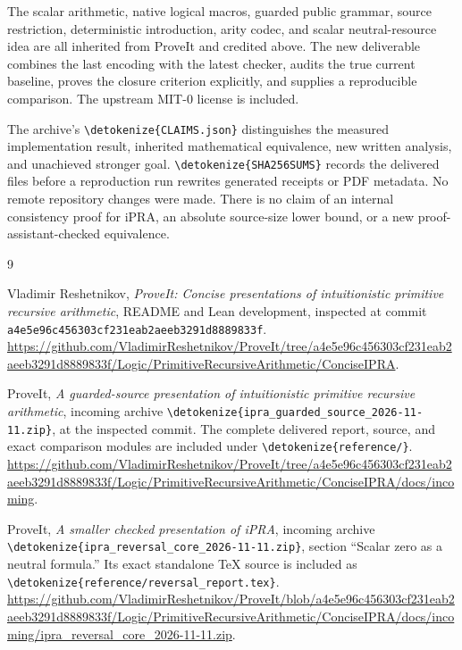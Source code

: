\documentclass[11pt,letterpaper]{article}
\theoremstyle{definition}
\theoremstyle{remark}
\newcommand{\file}[1]{\expandafter\nolinkurl\expandafter{\detokenize{#1}}}
\begin{document}
The scalar arithmetic, native logical macros, guarded public grammar,
source restriction, deterministic introduction, arity codec, and scalar
neutral-resource idea are all inherited from ProveIt and credited above.
The new deliverable combines the last encoding with the latest checker,
audits the true current baseline, proves the closure criterion explicitly,
and supplies a reproducible comparison. The upstream MIT-0 license is
included.

The archive's \file{CLAIMS.json} distinguishes the measured implementation
result, inherited mathematical equivalence, new written analysis, and
unachieved stronger goal. \file{SHA256SUMS} records the delivered files
before a reproduction run rewrites generated receipts or PDF metadata.
No remote repository changes were made. There is no claim of an internal
consistency proof for iPRA, an absolute source-size lower bound, or a new
proof-assistant-checked equivalence.

\begin{thebibliography}{9}
\raggedright
{}
Vladimir Reshetnikov, \emph{ProveIt: Concise presentations of intuitionistic
primitive recursive arithmetic}, README and Lean development, inspected
at commit \texttt{a4e5e96c456303cf231eab2aeeb3291d8889833f}.
\url{https://github.com/VladimirReshetnikov/ProveIt/tree/a4e5e96c456303cf231eab2aeeb3291d8889833f/Logic/PrimitiveRecursiveArithmetic/ConciseIPRA}.

ProveIt, \emph{A guarded-source presentation of intuitionistic primitive
recursive arithmetic}, incoming archive
\file{ipra_guarded_source_2026-11-11.zip}, at the inspected commit.
The complete delivered report, source, and exact comparison modules are
included under \file{reference/}.
\url{https://github.com/VladimirReshetnikov/ProveIt/tree/a4e5e96c456303cf231eab2aeeb3291d8889833f/Logic/PrimitiveRecursiveArithmetic/ConciseIPRA/docs/incoming}.

ProveIt, \emph{A smaller checked presentation of iPRA}, incoming archive
\file{ipra_reversal_core_2026-11-11.zip}, section ``Scalar zero as a neutral
formula.'' Its exact standalone TeX source is included as
\file{reference/reversal_report.tex}.
\url{https://github.com/VladimirReshetnikov/ProveIt/blob/a4e5e96c456303cf231eab2aeeb3291d8889833f/Logic/PrimitiveRecursiveArithmetic/ConciseIPRA/docs/incoming/ipra_reversal_core_2026-11-11.zip}.
\end{thebibliography}
\end{document}
